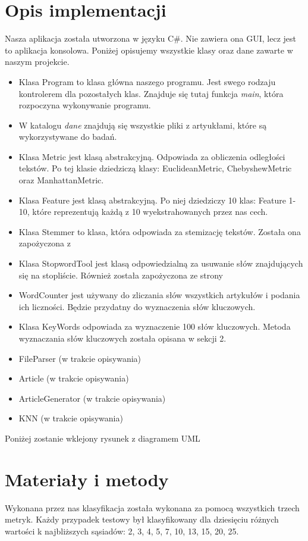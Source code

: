 \documentclass{classrep}
\begin{document}
\section{Opis implementacji} %
Nasza aplikacja została utworzona w języku C\#. Nie zawiera ona GUI, lecz jest to aplikacja konsolowa. Poniżej opisujemy wszystkie klasy oraz dane zawarte w naszym projekcie.
\begin{itemize}
\item Klasa Program to klasa główna naszego programu. Jest swego rodzaju kontrolerem dla pozostałych klas. Znajduje się tutaj funkcja \textsl{main}, która rozpoczyna wykonywanie programu.
\item W katalogu \textsl{dane} znajdują się wszystkie pliki z artyukłami, które są wykorzystywane do badań.
\item Klasa Metric jest klasą abstrakcyjną. Odpowiada za obliczenia odległości tekstów. Po tej klasie dziedziczą klasy: EuclideanMetric, ChebyshewMetric oraz ManhattanMetric.
\item Klasa Feature jest klasą abstrakcyjną. Po niej dziedziczy 10 klas: Feature 1-10, które reprezentują każdą z 10 wyekstrahowanych przez nas cech.
\item Klasa Stemmer to klasa, która odpowiada za stemizację tekstów. Została ona zapożyczona z \cite{stemmer}
\item Klasa StopwordTool jest klasą odpowiedzialną za usuwanie słów znajdujących się na stopliście. Również została zapożyczona ze strony \cite{stopword}
\item WordCounter jest używany do zliczania słów wszystkich artykułów i podania ich liczności. Będzie przydatny do  wyznaczenia słów kluczowych.
\item Klasa KeyWords odpowiada za wyznaczenie 100 słów kluczowych. Metoda wyznaczania słów kluczowych została opisana w sekcji 2.
\item FileParser (w trakcie opisywania)
\item Article (w trakcie opisywania)
\item ArticleGenerator (w trakcie opisywania)
\item KNN (w trakcie opisywania)
\end{itemize}
Poniżej zostanie wklejony rysunek z diagramem UML

  

\section{Materiały i metody} %
Wykonana przez nas klasyfikacja została wykonana za pomocą wszystkich trzech metryk. Każdy przypadek testowy był klasyfikowany dla dziesięciu różnych wartości k najbliższych sąsiadów: 2, 3, 4, 5, 7, 10, 13, 15, 20, 25.
\end{document}
